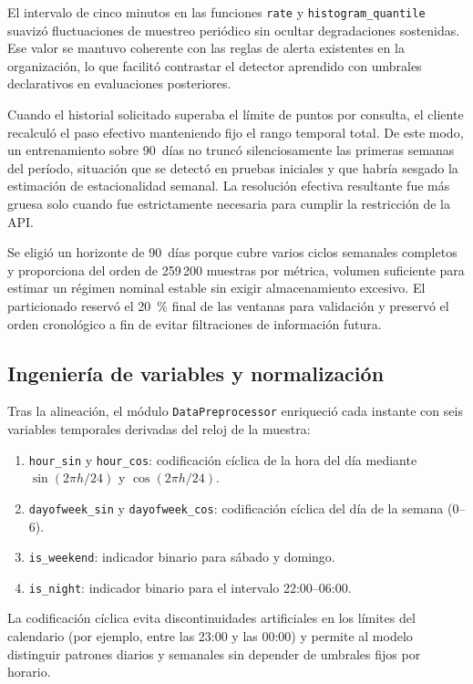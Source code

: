El intervalo de cinco minutos en las funciones \texttt{rate} y \texttt{histogram\_quantile} suavizó fluctuaciones de muestreo periódico sin ocultar degradaciones sostenidas. Ese valor se mantuvo coherente con las reglas de alerta existentes en la organización, lo que facilitó contrastar el detector aprendido con umbrales declarativos en evaluaciones posteriores.

Cuando el historial solicitado superaba el límite de puntos por consulta, el cliente recalculó el paso efectivo manteniendo fijo el rango temporal total. De este modo, un entrenamiento sobre 90~días no truncó silenciosamente las primeras semanas del período, situación que se detectó en pruebas iniciales y que habría sesgado la estimación de estacionalidad semanal. La resolución efectiva resultante fue más gruesa solo cuando fue estrictamente necesaria para cumplir la restricción de la API.

Se eligió un horizonte de 90~días porque cubre varios ciclos semanales completos y proporciona del orden de 259\,200 muestras por métrica, volumen suficiente para estimar un régimen nominal estable sin exigir almacenamiento excesivo. El particionado reservó el 20~\% final de las ventanas para validación y preservó el orden cronológico a fin de evitar filtraciones de información futura.

\subsection{Ingeniería de variables y normalización}

Tras la alineación, el módulo \texttt{DataPreprocessor} enriqueció cada instante con seis variables temporales derivadas del reloj de la muestra:

\begin{enumerate}
\item \texttt{hour\_sin} y \texttt{hour\_cos}: codificación cíclica de la hora del día mediante $\sin(2\pi h/24)$ y $\cos(2\pi h/24)$.
\item \texttt{dayofweek\_sin} y \texttt{dayofweek\_cos}: codificación cíclica del día de la semana ($0$--$6$).
\item \texttt{is\_weekend}: indicador binario para sábado y domingo.
\item \texttt{is\_night}: indicador binario para el intervalo 22:00--06:00.
\end{enumerate}

La codificación cíclica evita discontinuidades artificiales en los límites del calendario (por ejemplo, entre las 23:00 y las 00:00) y permite al modelo distinguir patrones diarios y semanales sin depender de umbrales fijos por horario.

